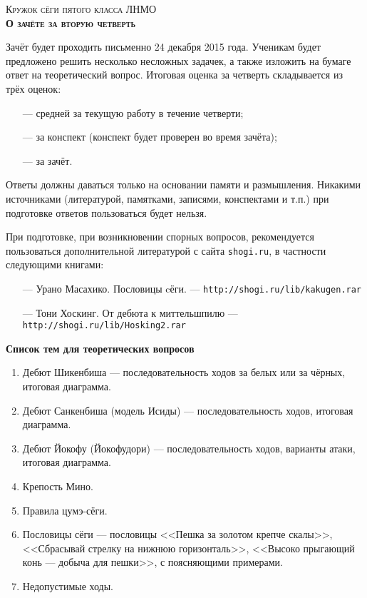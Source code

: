 \documentclass[12pt]{article}
\begin{document}
\begin{CJK}{UTF8}{min}
\begin{center}{{\scshape\large Кружок сёги пятого класса ЛНМО}\bfseries\\\medbreak \scshape\Large О зачёте за вторую четверть}\end{center}

\vspace{0.3cm}
\noindent Зачёт будет проходить письменно 24 декабря 2015 года. Ученикам будет предложено 
решить несколько несложных задачек, а также изложить на бумаге ответ на теоретический вопрос.
\bigbreak
\noindent Итоговая оценка за четверть складывается из трёх оценок:
\begin{itemize}
\setlength{\parskip}{-1ex}\relax
\item[---] средней за текущую работу в течение четверти;
\item[---] за конспект (конспект будет проверен во время зачёта);
\item[---] за зачёт.
\end{itemize}

\bigbreak
\noindent Ответы должны даваться только на основании памяти и размышления.
Никакими источниками (литературой, памятками, записями, конспектами и т.п.) при подготовке
ответов пользоваться будет нельзя.

\bigbreak
\noindent При подготовке, при возникновении спорных вопросов, рекомендуется пользоваться дополнительной 
литературой с сайта \texttt{shogi.ru}, в частности следующими книгами:
\begin{itemize}
\setlength{\parskip}{-1ex}\relax
\item[---] Урано Масахико. Пословицы cёги. --- \texttt{http://shogi.ru/lib/kakugen.rar}
\item[---] Тони Хоскинг. От дебюта к миттельшпилю --- \texttt{http://shogi.ru/lib/Hosking2.rar}
\end{itemize}

\bigbreak
\begin{center}\bfseries\large Список тем для теоретических вопросов\end{center}

\begin{enumerate}
\setlength{\parskip}{-0.3ex}\relax
\item Дебют Шикенбиша --- последовательность ходов за белых или за чёрных, итоговая диаграмма.
\item Дебют Санкенбиша (модель Исиды) --- последовательность ходов, итоговая диаграмма.
\item Дебют Йокофу (Йокофудори) --- последовательность ходов, варианты атаки, итоговая диаграмма.
\item Крепость Мино.
\item Правила цумэ-сёги.
\item Пословицы сёги --- пословицы <<Пешка за золотом крепче скалы>>, <<Сбрасывай стрелку на нижнюю горизонталь>>,
<<Высоко прыгающий конь --- добыча для пешки>>, с поясняющими примерами.
\item Недопустимые ходы.
\end{enumerate}


\end{CJK}
\end{document}
